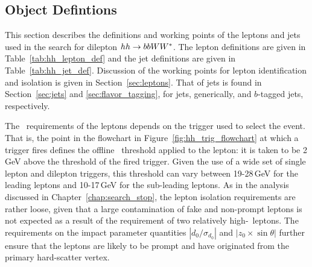 %
%
\subsection{Object Defintions}
\label{sec:hh_object_def}

This section describes the definitions and working points of the leptons and jets used
in the search for dilepton $hh \rightarrow bbWW^*$.
The lepton definitions are given in Table~\ref{tab:hh_lepton_def} and the jet definitions are
given in Table~\ref{tab:hh_jet_def}.
Discussion of the working points for lepton identification and isolation is given in
Section~\ref{sec:leptons}.
That of jets is found in Section~\ref{sec:jets} and \ref{sec:flavor_tagging}, for
jets, generically, and $b$-tagged jets, respectively.

The \pT~requirements of the leptons depends on the trigger used to select the event.
That is, the point in the flowchart in Figure~\ref{fig:hh_trig_flowchart} at which
a trigger fires defines the offline \pT~threshold applied to the lepton: it is taken
to be 2\,GeV above the threshold of the fired trigger.
Given the use of a wide set of single lepton and dilepton triggers, this threshold
can vary between 19-28\,GeV for the leading leptons and 10-17\,GeV for the sub-leading leptons.
As in the analysis discussed in Chapter~\ref{chap:search_stop},
the lepton isolation requirements are rather loose, given that a large contamination of
fake and non-prompt leptons is not expected as a result of the requirement of two relatively
high-\pT~leptons.
The requirements on the impact parameter quantities $|d_0 / \sigma_{d_0}|$ and $|z_0 \times \sin \theta|$
further ensure that the leptons are likely to be prompt and have originated
from the primary hard-scatter vertex.

